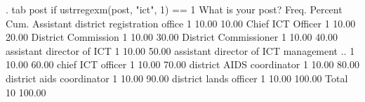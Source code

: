 {\smallskip}
. tab post if ustrregexm(post, "ict", 1) == 1
{\smallskip}
                     What is your post? {\VBAR}      Freq.     Percent        Cum.
 Assistant district registration office {\VBAR}          1       10.00       10.00
                      Chief ICT Officer {\VBAR}          1       10.00       20.00
                    District Commission {\VBAR}          1       10.00       30.00
                  District Commissioner {\VBAR}          1       10.00       40.00
              assistant director of ICT {\VBAR}          1       10.00       50.00
assistant director of ICT management .. {\VBAR}          1       10.00       60.00
                      chief ICT officer {\VBAR}          1       10.00       70.00
              district AIDS coordinator {\VBAR}          1       10.00       80.00
              district aids coordinator {\VBAR}          1       10.00       90.00
                 district lands officer {\VBAR}          1       10.00      100.00
                                  Total {\VBAR}         10      100.00
